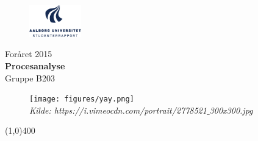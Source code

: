 \clearpage
\thispagestyle{empty}

\begin{figure}[H]
	\raggedleft
		\includegraphics[width=0.2\textwidth]{figures/aaulogo-da.png}
\end{figure}
\vspace*{\fill} 
\begin{center}	
\begin{Huge}
Foråret 2015\\
\vspace{5 mm}
\textbf{Procesanalyse}\\
\vspace{3 mm}
Gruppe B203
\end{Huge}
\end{center}
\vspace*{\fill}

\begin{figure}[H]
		\centering
		\texttt{[image: figures/yay.png]}
		\\ \small{\textit{Kilde: https://i.vimeocdn.com/portrait/2778521$\_$300x300.jpg}}
		\flushleft
\end{figure}


\begin{center}
\line(1,0){400}
\end{center}